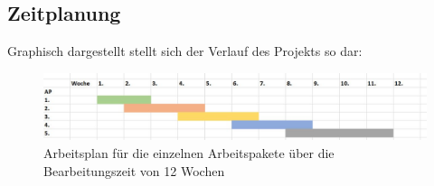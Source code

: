 \subsection{Zeitplanung}

Graphisch dargestellt stellt sich der Verlauf des Projekts so dar:

\begin{figure}[h]
	\begin{center}
		\includegraphics[scale=0.5]{Zeitplan_graphisch.jpg}
		\caption[Arbeitsplan]{Arbeitsplan für die einzelnen Arbeitspakete über die Bearbeitungszeit von 12 Wochen}
	\end{center}
\end{figure}


















